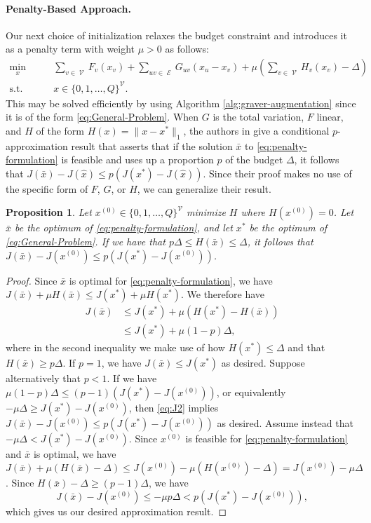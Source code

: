 \documentclass[pdflatex,sn-mathphys-num]{sn-jnl}%
\newtheorem{prop}[theorem]{Proposition}
\DeclareMathOperator{\Ecal}{\mathcal{E}}
\DeclareMathOperator{\Vcal}{\mathcal{V}}
\begin{document}
\paragraph{Penalty-Based Approach.}
Our next choice of initialization relaxes the budget constraint and introduces it as a penalty term with weight $\mu > 0$ as follows:
\begin{subequations}
\begin{align}
    \min_{x} \qquad& \sum_{v\in \Vcal}F_v(x_v) + \sum_{uv\in \Ecal}G_{uv}(x_u - x_v) + \mu \left(\sum_{v \in \Vcal} H_v(x_v) - \Delta\right) \\
    \text{s.t.} \qquad& x \in \{0,1,\ldots,Q\}^{\Vcal} .
\end{align}\label{eq:penalty-formulation}%
\end{subequations}
This may be solved efficiently by using Algorithm \ref{alg:graver-augmentation} since it is of the form \eqref{eq:General-Problem}. 
When $G$ is the total variation, $F$ linear, and $H$ of the form $H(x) = \|x-x^*\|_1$, the authors in \cite{manns2024discrete} give a conditional $p$-approximation result that asserts that if the solution $\bar{x}$ to \eqref{eq:penalty-formulation} is feasible and uses up a proportion $p$ of the budget $\Delta$, it follows that $J(\bar{x}) - J(\hat{x}) \le p(J(x^*) - J(\hat{x}))$. Since their proof makes no use of the specific form of $F$, $G$, or $H$,  we can generalize their result.
\begin{prop}\label{prop:penalty-form}
    Let $x^{(0)} \in \{0,1,\ldots,Q\}^{\Vcal}$ minimize $H$ where $H(x^{(0)}) = 0$. Let $\bar{x}$ be the optimum of \eqref{eq:penalty-formulation}, and let $x^*$ be the optimum of \eqref{eq:General-Problem}. If we have that $p\Delta \le H(\bar{x})\le \Delta$, it follows that $J(\bar{x}) - J(x^{(0)}) \le p(J(x^*) - J(x^{(0)}))$.
\end{prop}
\begin{proof}
    Since $\bar{x}$ is optimal for \eqref{eq:penalty-formulation}, we have $J(\bar{x}) + \mu H(\bar{x}) \le J(x^*) + \mu H(x^*)$. We therefore have
    \begin{align}
    J(\bar{x}) &\le J(x^*) + \mu (H(x^*) - H(\bar{x})) \\
        &\le J(x^*) + \mu(1 - p)\Delta , \label{eq:J2}
    \end{align}
where in the second inequality we make use of how $H(x^*)\le \Delta$ and that $H(\bar{x}) \ge p\Delta$. 
If $p = 1$, we have $J(\bar{x}) \le J(x^*)$ as desired. Suppose alternatively that $p < 1$. 
If we have $\mu(1-p)\Delta \le (p-1)(J(x^*) - J(x^{(0)}))$, or equivalently $-\mu\Delta \ge J(x^*) - J(x^{(0)})$, then \eqref{eq:J2} implies $J(\bar{x}) - J(x^{(0)}) \le p(J(x^*) - J(x^{(0)}))$ as desired. 
Assume instead that $-\mu\Delta < J(x^*) - J(x^{(0)})$. 
Since $x^{(0)}$ is feasible for \eqref{eq:penalty-formulation} and $\bar{x}$ is optimal, we have $J(\bar{x}) + \mu(H(\bar{x}) - \Delta)\le J(x^{(0)})-\mu(H(x^{(0)}) - \Delta) = J(x^{(0)}) - \mu \Delta$. Since $H(\bar{x}) - \Delta \ge (p-1)\Delta$, we have
    \[
        J(\bar{x})  - J(x^{(0)}) \le -\mu p\Delta < p(J(x^*)-J(x^{(0)})) ,
    \]
which gives us our desired approximation result.
\end{proof}
\end{document}
